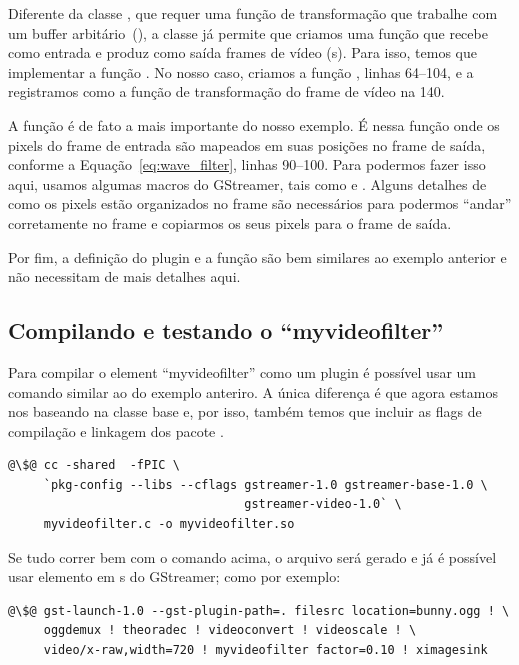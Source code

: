 Diferente da classe , que requer uma função de transformação que
trabalhe com um buffer arbitário~(), a classe 
já permite que criamos uma função que recebe como entrada e produz como saída
frames de vídeo (s).  Para isso, temos que implementar a
função .  No nosso caso, criamos a função
, linhas 64--104, e a registramos como a função
de transformação do frame de vídeo na 140.

A função  é de fato a mais importante do nosso exemplo.
É nessa função onde os pixels do frame de entrada são mapeados em suas posições
no frame de saída, conforme a Equação~\ref{eq:wave_filter}, linhas 90--100.
Para podermos fazer isso aqui, usamos algumas macros do GStreamer, tais como
 e .  Alguns
detalhes de como os pixels estão organizados no frame são necessários para
podermos ``andar'' corretamente no frame e copiarmos os seus pixels para o
frame de saída. 

Por fim, a definição do plugin e a função  são bem
similares ao exemplo anterior e não necessitam de mais detalhes aqui.

\subsection*{Compilando e testando o ``myvideofilter''}
Para compilar o element ``myvideofilter'' como um plugin é possível usar um
comando similar ao do exemplo anteriro.  A única diferença é que agora estamos
nos baseando na classe base  e, por isso, também temos que
incluir as flags de compilação e linkagem dos pacote .

\begin{lstlisting}[style=command]
@\$@ cc -shared  -fPIC \
     `pkg-config --libs --cflags gstreamer-1.0 gstreamer-base-1.0 \
                                 gstreamer-video-1.0` \
     myvideofilter.c -o myvideofilter.so
\end{lstlisting}

Se tudo correr bem com o comando acima, o arquivo  será
gerado e já é possível usar elemento em s do GStreamer; como por
exemplo:

\begin{lstlisting}[style=command]
@\$@ gst-launch-1.0 --gst-plugin-path=. filesrc location=bunny.ogg ! \
     oggdemux ! theoradec ! videoconvert ! videoscale ! \
     video/x-raw,width=720 ! myvideofilter factor=0.10 ! ximagesink
\end{lstlisting}


